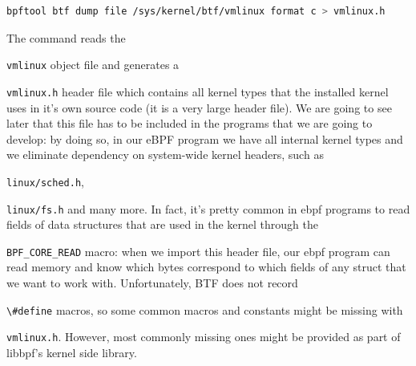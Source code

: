 \begin{lstlisting}[style=commandline, language=bash, caption={\colorbox{backcolour}{\lstinline[style=commandline, language=bash]|vmlinux.h|} generation command.}]
	bpftool btf dump file /sys/kernel/btf/vmlinux format c > vmlinux.h
\end{lstlisting}

The command reads the \raggedright\colorbox{backcolour}{\lstinline[style=commandline, language=bash]|vmlinux|} object file and generates a \raggedright\colorbox{backcolour}{\lstinline[style=commandline, language=bash]|vmlinux.h|} header file which contains all kernel types that the installed kernel uses in it’s own source code (it is a very large header file). 
We are going to see later that this file has to be included in the programs that we are going to develop: by doing so, in our eBPF program we have all internal kernel types and we eliminate dependency on system-wide kernel headers, such as \raggedright\colorbox{backcolour}{\lstinline[style=commandline, language=bash]|linux/sched.h|}, \raggedright\colorbox{backcolour}{\lstinline[style=commandline, language=bash]|linux/fs.h|} and many more.
In fact, it’s pretty common in ebpf programs to read fields of data structures that are used in the kernel through the \raggedright\colorbox{backcolour}{\lstinline[style=commandline, language=bash]|BPF_CORE_READ|} macro: when we import this header file, our ebpf program can read memory and know which bytes correspond to which fields of any struct that we want to work with.
Unfortunately, BTF does not record \raggedright\colorbox{backcolour}{\lstinline[style=commandline, language=bash]|\#define|} macros, so some common macros and constants might be missing with \raggedright\colorbox{backcolour}{\lstinline[style=commandline, language=bash]|vmlinux.h|}. 
However, most commonly missing ones might be provided as part of libbpf’s kernel side library.


